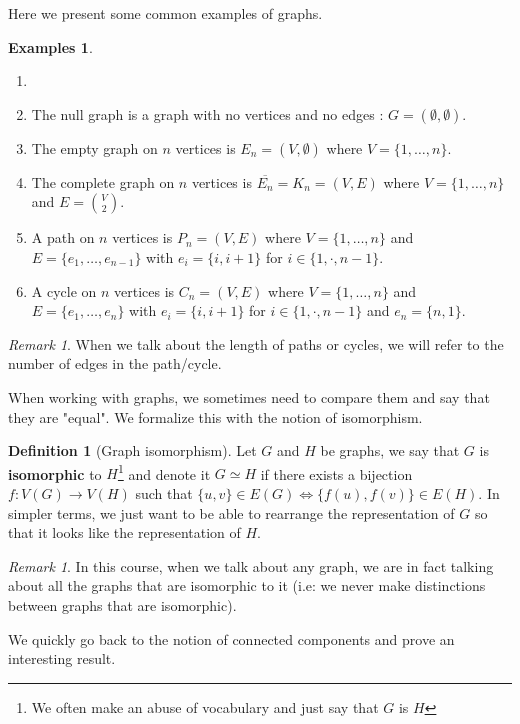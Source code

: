 \documentclass{tufte-handout}
\theoremstyle{definition}
\newtheorem{defn}[thm]{Definition}
\newtheorem{exmps}[thm]{Examples}
\theoremstyle{remark}
\newtheorem{rem}[thm]{Remark}
\begin{document}
Here we present some common examples of graphs.
\begin{exmps}
	\begin{enumerate}
		\item[]
		\item The null graph is a graph with no vertices and no edges : $G = (\emptyset, \emptyset)$.
		\item The empty graph on $n$ vertices is $E_n = (V, \emptyset)$ where $V = \{1,\dots, n\}$.
		\item The complete graph on $n$ vertices is $\overline{E_n} = K_n = (V, E)$ where $V = \{1,\dots, n\}$ and $E = \binom{V}{2}$.
		\item A path on $n$ vertices is $P_n = (V,E)$ where $V = \{1,\dots, n\}$ and $E = \{e_1, \dots, e_{n-1}\}$ with $e_i = \{i, i+1\}$ for $i \in \{1,\cdot, n-1\}$.
		\item A cycle on $n$ vertices is $C_n = (V,E)$ where $V = \{1,\dots, n\}$ and $E = \{e_1, \dots, e_{n}\}$ with $e_i = \{i, i+1\}$ for $i \in \{1,\cdot, n-1\}$ and $e_n = \{n, 1\}$.
	\end{enumerate}
\end{exmps}
\begin{rem}
	When we talk about the length of paths or cycles, we will refer to the number of edges in the path/cycle.
\end{rem}

When working with graphs, we sometimes need to compare them and say that they are "equal". We formalize this with the notion of isomorphism.

\begin{defn}[Graph isomorphism]
	Let $G$ and $H$ be graphs, we say that $G$ is \textbf{isomorphic} to $H$\footnote{We often make an abuse of vocabulary and just say that $G$ is $H$} and denote it $G \simeq H$ if there exists a bijection $f: V(G) \rightarrow V(H)$ such that $\{u,v\} \in E(G) \Leftrightarrow \{f(u), f(v)\} \in E(H)$. In simpler terms, we just want to be able to rearrange the representation of $G$ so that it looks like the representation of $H$.
\end{defn}
\begin{rem}
	In this course, when we talk about any graph, we are in fact talking about all the graphs that are isomorphic to it (i.e: we never make distinctions between graphs that are isomorphic).
\end{rem}

We quickly go back to the notion of connected components and prove an interesting result.
\end{document}
